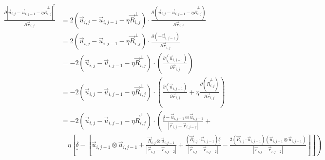 \documentclass{article}
\renewcommand{\ij}{_{i,j}}
\newcommand{\ijj}{_{i,j-1}}
\newcommand{\ijjj}{_{i,j-2}}
\newcommand{\magn}[1]{\left\vert #1 \right\vert }
\renewcommand{\part}[2]{\frac{\partial #1 }{\partial #2}}
\newcommand{\ten}[1]{\underline{\underline{#1}}}
\newcommand{\rij}{\vec{r} \ij}
\newcommand{\Rij}{\vec{R} \ij}
\newcommand{\rijjj}{\vec{r} \ijjj}
\newcommand{\uij}{\vec{u} \ij}
\newcommand{\uijj}{\vec{u} \ijj}
\begin{document}
\begin{align*}
  \part{\magn{\uij - \uijj - \eta \Rij^\perp}^2 }{
    \rij 
  }
  &=
  2\left(\uij - \uijj - \eta \Rij^\perp\right) \cdot
  \part{\left(\uij - \uijj - \eta \Rij^\perp\right)}{\rij}
  \\
  &=
  2\left(\uij - \uijj - \eta \Rij^\perp\right) \cdot
  \part{\left(- \uijj \right)}{\rij}
  \\
  &=
  -
  2\left(\uij - \uijj - \eta \Rij^\perp\right) \cdot
  \left(
  \part{\left(\uijj \right)}{\rij}
  \right)
  \\
  &=
  -
  2\left(\uij - \uijj - \eta \Rij^\perp\right) \cdot
  \left(
  \part{\left(\uijj \right)}{\rij}
  +
  \eta
  \part{\left( \Rij^\perp\right)}{\rij}
  \right)
  \\
  &=
  -
  2\left(\uij - \uijj - \eta \Rij^\perp\right) \cdot
  \left(
  \frac{\ten{\delta} - \uijj \otimes \uijj}{\magn{\rij - \rijjj}}
  + \right. \\
  & \quad 
  \left. 
  \eta
  \left[
  \ten{\delta} 
  -
  \left[
  \uijj \otimes \uijj
  + 
  \frac{\Rij \otimes \uijj }{\magn{\rij - \rijjj}} 
  +
  \frac{ \left( 
    \Rij \cdot \uijj
    \right) \ten{\delta}}{\magn{\rij - \rijjj}}
  -
  \frac{
    2 \left(
      \Rij \cdot \uijj 
    \right)
    \left(\uijj \otimes \uijj 
    \right)
    }{\magn{\rij - \rijjj}}
  \right]
  \right]
  \right)
\end{align*}
\end{document}
